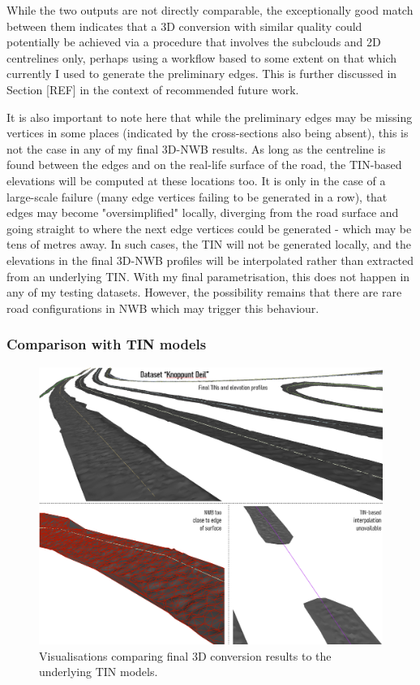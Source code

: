 While the two outputs are not directly comparable, the exceptionally good match between them indicates that a 3D conversion with similar quality could potentially be achieved via a procedure that involves the subclouds and 2D centrelines only, perhaps using a workflow based to some extent on that which currently I used to generate the preliminary edges. This is further discussed in Section [REF] in the context of recommended future work.

It is also important to note here that while the preliminary edges may be missing vertices in some places (indicated by the cross-sections also being absent), this is not the case in any of my final 3D-NWB results. As long as the centreline is found between the edges and on the real-life surface of the road, the TIN-based elevations will be computed at these locations too. It is only in the case of a large-scale failure (many edge vertices failing to be generated in a row), that edges may become "oversimplified" locally, diverging from the road surface and going straight to where the next edge vertices could be generated - which may be tens of metres away. In such cases, the TIN will not be generated locally, and the elevations in the final 3D-NWB profiles will be interpolated rather than extracted from an underlying TIN. With my final parametrisation, this does not happen in any of my testing datasets. However, the possibility remains that there are rare road configurations in NWB which may trigger this behaviour.

\subsubsection{Comparison with TIN models}

\begin{figure}
    \centering
    \includegraphics[width=0.9\linewidth]{final_report/figs/elevationinterpolation1.png}
    \caption{Visualisations comparing final 3D conversion results to the underlying TIN models.}
    \label{fig:elevationinterpolation1}
\end{figure}

